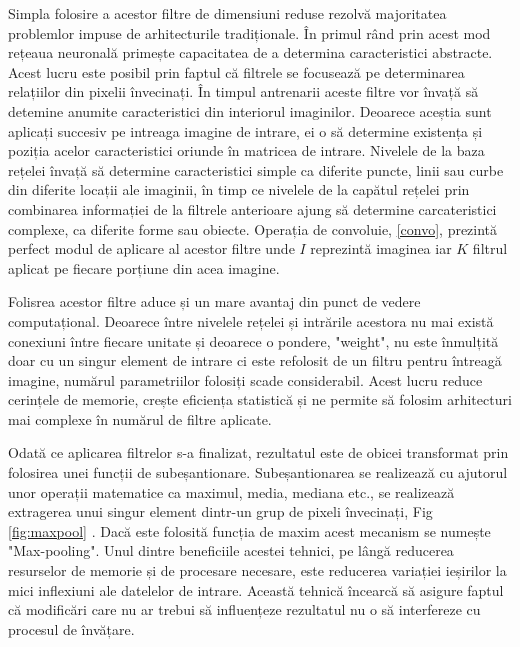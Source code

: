 \documentclass[a4paper,12pt]{book}
\begin{document}
				Simpla folosire a acestor filtre de dimensiuni reduse rezolvă majoritatea problemlor impuse de arhitecturile tradiționale. În primul rând prin acest mod rețeaua neuronală primește capacitatea de a determina caracteristici abstracte. Acest lucru este posibil prin faptul că filtrele se focusează pe determinarea relațiilor din pixelii învecinați. În timpul antrenarii aceste filtre vor învață să detemine anumite caracteristici din interiorul imaginilor. Deoarece aceștia sunt aplicați succesiv pe intreaga imagine de intrare, ei o să determine existența și poziția acelor caracteristici oriunde în matricea de intrare. Nivelele de la baza rețelei învață să determine caracteristici simple ca diferite puncte, linii sau curbe din diferite locații ale imaginii, în timp ce nivelele de la capătul rețelei prin combinarea informației de la filtrele anterioare ajung să determine carcateristici complexe, ca diferite forme sau obiecte. Operația de convoluie, \ref{convo}, prezintă perfect modul de aplicare al acestor filtre unde $I$ reprezintă imaginea iar $K$ filtrul aplicat pe fiecare porțiune din acea imagine.\par
				
				Folisrea acestor filtre aduce și un mare avantaj din punct de vedere computațional. Deoarece între nivelele rețelei și intrările acestora nu mai există conexiuni între fiecare unitate și deoarece o pondere, "weight", nu este înmulțită doar cu un singur element de intrare ci este refolosit de un filtru pentru întreagă imagine, numărul parametriilor folosiți scade considerabil. Acest lucru reduce cerințele de memorie, crește eficiența statistică și ne permite să folosim arhitecturi mai complexe în numărul de filtre aplicate. \par
				
				Odată ce aplicarea filtrelor s-a finalizat, rezultatul este de obicei transformat prin folosirea unei funcții de subeșantionare. Subeșantionarea se realizează cu ajutorul unor operații matematice ca maximul, media, mediana etc., se realizează extragerea unui singur element dintr-un grup de pixeli învecinați, Fig \ref{fig:maxpool} . Dacă este folosită funcția de maxim acest mecanism se numește "Max-pooling". Unul dintre beneficiile acestei tehnici, pe lângă reducerea resurselor de memorie și de procesare necesare, este reducerea variației ieșirilor la mici inflexiuni ale datelelor de intrare. Această tehnică încearcă să asigure faptul că modificări care nu ar trebui să influențeze rezultatul nu o să interfereze cu procesul de învățare. \par
				
\end{document}
